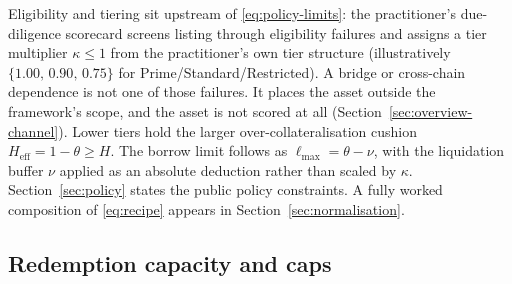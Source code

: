 Eligibility and tiering sit upstream of \eqref{eq:policy-limits}: the practitioner's due-diligence scorecard screens listing through eligibility failures and assigns a tier multiplier $\kappa\le 1$ from the practitioner's own tier structure (illustratively $\{1.00,\,0.90,\,0.75\}$ for Prime/Standard/Restricted). A bridge or cross-chain dependence is not one of those failures. It places the asset outside the framework's scope, and the asset is not scored at all (Section~\ref{sec:overview-channel}). Lower tiers hold the larger over-collateralisation cushion $H_{\mathrm{eff}}=1-\theta\ge H$. The borrow limit follows as $\ell_{\max}=\theta-\nu$, with the liquidation buffer $\nu$ applied as an absolute deduction rather than scaled by $\kappa$. Section~\ref{sec:policy} states the public policy constraints. A fully worked composition of \eqref{eq:recipe} appears in Section~\ref{sec:normalisation}.

\subsection{Redemption capacity and caps}\label{sec:theory:capacity}

